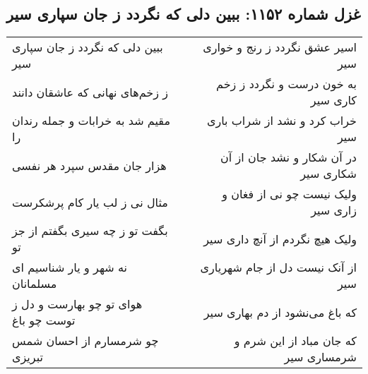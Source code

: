 \begin{center}
\section*{غزل شماره ۱۱۵۲: ببین دلی که نگردد ز جان سپاری سیر}
\label{sec:1152}
\begin{longtable}{l p{0.5cm} r}
ببین دلی که نگردد ز جان سپاری سیر
&&
اسیر عشق نگردد ز رنج و خواری سیر
\\
ز زخم‌های نهانی که عاشقان دانند
&&
به خون درست و نگردد ز زخم کاری سیر
\\
مقیم شد به خرابات و جمله رندان را
&&
خراب کرد و نشد از شراب باری سیر
\\
هزار جان مقدس سپرد هر نفسی
&&
در آن شکار و نشد جان از آن شکاری سیر
\\
مثال نی ز لب یار کام پرشکرست
&&
ولیک نیست چو نی از فغان و زاری سیر
\\
بگفت تو ز چه سیری بگفتم از جز تو
&&
ولیک هیچ نگردم از آنچ داری سیر
\\
نه شهر و یار شناسیم ای مسلمانان
&&
از آنک نیست دل از جام شهریاری سیر
\\
هوای تو چو بهارست و دل ز توست چو باغ
&&
که باغ می‌نشود از دم بهاری سیر
\\
چو شرمسارم از احسان شمس تبریزی
&&
که جان مباد از این شرم و شرمساری سیر
\\
\end{longtable}
\end{center}

